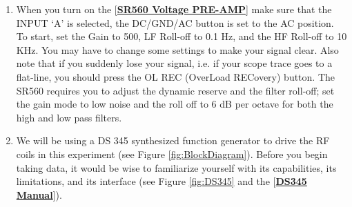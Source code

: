 \documentclass{../lab}
\newcommand{\SRVoltagePREAMP}{http://physics111.lib.berkeley.edu/Physics111/Equipment_Manuals/SRS/SR560m.pdf}
\newcommand{\DSManual}{http://physics111.lib.berkeley.edu/Physics111/Equipment_Manuals/SRS/DS345m.pdf}
\begin{document}
\begin{enumerate}
    \item When you turn on the [\href{\SRVoltagePREAMP}{\textbf{SR560 Voltage PRE-AMP}}] make sure that the INPUT ‘A' is selected, the DC/GND/AC button is set to the AC position. To start, set the Gain to 500, LF Roll-off to 0.1 Hz, and the HF Roll-off to 10 KHz. You may have to change some settings to make your signal clear. Also note that if you suddenly lose your signal, i.e. if your scope trace goes to a flat-line, you should press the OL REC (OverLoad RECovery) button. The SR560 requires you to adjust the dynamic reserve and the filter roll-off; set the gain mode to low noise and the roll off to 6 dB per octave for both the high and low pass filters.

    \item We will be using a DS 345 synthesized function generator to drive the RF coils in this experiment (see Figure \ref{fig:BlockDiagram}). Before you begin taking data, it would be wise to familiarize yourself with its capabilities, its limitations, and its interface (see Figure \ref{fig:DS345} and the [\href{\DSManual}{\textbf{DS345 Manual}}]).
\end{enumerate}
\end{document}
